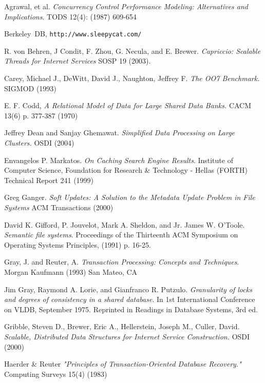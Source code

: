 \documentclass[10pt,letterpaper,twocolumn,english]{article}
\begin{document}
\begin{thebibliography}{99}
\begin{small}
 Agrawal, et al. {\em Concurrency Control Performance Modeling: Alternatives and Implications}. TODS 12(4): (1987) 609-654

 Berkeley~DB, {\tt http://www.sleepycat.com/}

 R. von Behren, J Condit, F. Zhou, G. Necula, and E. Brewer. {\em Capriccio: Scalable Threads for Internet Services} SOSP 19 (2003).

 Carey, Michael J., DeWitt, David J., Naughton, Jeffrey F. {\em The OO7 Benchmark.} SIGMOD (1993)

 E. F. Codd, {\em A Relational Model of Data for Large Shared Data Banks.} CACM 13(6) p. 377-387 (1970)

 Jeffrey Dean and Sanjay Ghemawat. {\em Simplified Data Processing on Large Clusters. } OSDI (2004)

 Envangelos P. Markatos. {\em On Caching Search Engine Results}.  Institute of Computer Science, Foundation for Research \& Technology - Hellas (FORTH) Technical Report 241 (1999)

 Greg Ganger.  {\em Soft Updates: A Solution to the Metadata Update Problem in File Systems } ACM Transactions (2000)

 David K. Gifford, P. Jouvelot, Mark A. Sheldon, and Jr. James W. O'Toole. {\em Semantic file systems}. Proceedings of the Thirteenth ACM Symposium on Operating Systems Principles, (1991) p. 16-25.

 Gray, J. and Reuter, A. {\em Transaction Processing: Concepts and Techniques}. Morgan Kaufmann (1993) San Mateo, CA

 Jim Gray, Raymond A. Lorie, and Gianfranco R. Putzulo. {\em Granularity of locks and degrees of consistency in a shared database}. In 1st International Conference on VLDB, September 1975. Reprinted in Readings in Database Systems, 3rd ed.

  Gribble, Steven D., Brewer, Eric A., Hellerstein, Joseph M., Culler, David.  {\em Scalable, Distributed Data Structures for Internet Service Construction. } OSDI (2000)

 Haerder \& Reuter {\em "Principles of Transaction-Oriented Database Recovery." } Computing Surveys 15(4) (1983) %


\end{small}
\end{thebibliography}
\end{document}
